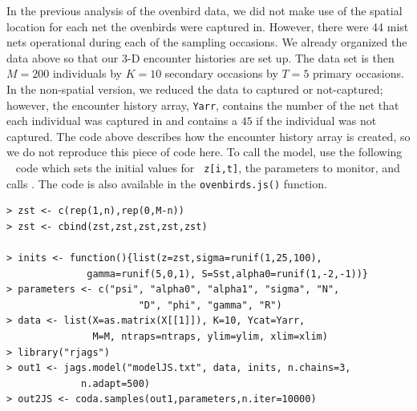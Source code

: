 In the previous analysis of the ovenbird data, we did not make use of
the spatial location for each net the ovenbirds were captured in.
However, there were 44 mist nets operational during each of the
sampling occasions.  We already organized the data above so that our
3-D encounter histories are set up.  The data set is then $M=200$
individuals by $K=10$ secondary occasions by $T=5$ primary occasions.
In the non-spatial version, we reduced the data to captured or
not-captured; however, the encounter history array, \mbox{\tt Yarr},
contains the number of the net that each individual was captured in
and contains a $45$ if the individual was not captured. The code above
describes how the encounter history array is created, so we do not
reproduce this piece of code here. To call the model, use the
following \R~ code which sets the initial values for \mbox{\tt
  z[i,t]}, the parameters to monitor, and calls \jags.  The code is
also available in the \verb+ovenbirds.js()+ function.

{\small 
\begin{verbatim}
> zst <- c(rep(1,n),rep(0,M-n))
> zst <- cbind(zst,zst,zst,zst,zst)

> inits <- function(){list(z=zst,sigma=runif(1,25,100),
              gamma=runif(5,0,1), S=Sst,alpha0=runif(1,-2,-1))}
> parameters <- c("psi", "alpha0", "alpha1", "sigma", "N",
                       "D", "phi", "gamma", "R")
> data <- list(X=as.matrix(X[[1]]), K=10, Ycat=Yarr,
               M=M, ntraps=ntraps, ylim=ylim, xlim=xlim)
> library("rjags")
> out1 <- jags.model("modelJS.txt", data, inits, n.chains=3,
             n.adapt=500)
> out2JS <- coda.samples(out1,parameters,n.iter=10000)
\end{verbatim}
}


